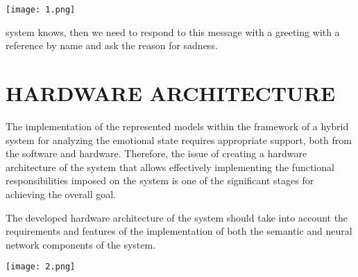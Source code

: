 \documentclass{report}
\begin{document}
\renewcommand{\thesection}{\Roman{section}}
\titleformat{\section}{\large\centering\sc}{\thesection. }{0cm}{}[]



\setcounter{section}{3}
\setcounter{page}{200}

\begin{figure}[thp]
\addtocounter{figure}{10} 
\end{figure}

\begin{multicols}{2}



\begin{minipage}{.5\textwidth}
\centering
    

    \texttt{[image: 1.png]}

\end{minipage}%

\vspace{1cm}

\noindent system knows, then we need to respond to this message
with a greeting with a reference by name and ask the
reason for sadness.

\section{HARDWARE ARCHITECTURE}

\par The implementation of the represented models within
the framework of a hybrid system for analyzing the
emotional state requires appropriate support, both from
the software and hardware. Therefore, the issue of creating a hardware architecture of the system that allows
effectively implementing the functional responsibilities
imposed on the system is one of the significant stages
for achieving the overall goal.
\par The developed hardware architecture of the system
should take into account the requirements and features
of the implementation of both the semantic and neural
network components of the system.



\columnbreak

\begin{minipage}{.5\textwidth}
\centering
\begin{center}
    \texttt{[image: 2.png]}
\end{center}


\end{minipage}
\end{multicols}
\end{document}
